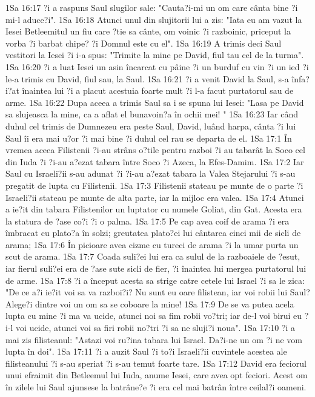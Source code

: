1Sa 16:17  ?i a raspuns Saul slugilor sale: "Cauta?i-mi un om care cânta bine ?i mi-l aduce?i".
1Sa 16:18  Atunci unul din slujitorii lui a zis: "Iata eu am vazut la Iesei Betleemitul un fiu care ?tie sa cânte, om voinic ?i razboinic, priceput la vorba ?i barbat chipe? ?i Domnul este cu el".
1Sa 16:19  A trimis deci Saul vestitori la Iesei ?i i-a spus: "Trimite la mine pe David, fiul tau cel de la turma".
1Sa 16:20  ?i a luat Iesei un asin încarcat cu pâine ?i un burduf cu vin ?i un ied ?i le-a trimis cu David, fiul sau, la Saul.
1Sa 16:21  ?i a venit David la Saul, s-a înfa?i?at înaintea lui ?i a placut acestuia foarte mult ?i l-a facut purtatorul sau de arme.
1Sa 16:22  Dupa aceea a trimis Saul sa i se spuna lui Iesei: "Lasa pe David sa slujeasca la mine, ca a aflat el bunavoin?a în ochii mei! "
1Sa 16:23  Iar când duhul cel trimis de Dumnezeu era peste Saul, David, luând harpa, cânta ?i lui Saul îi era mai u?or ?i mai bine ?i duhul cel rau se departa de el.
1Sa 17:1  În vremea aceea Filistenii ?i-au strâns o?tile pentru razboi ?i au tabarât la Soco cel din Iuda ?i ?i-au a?ezat tabara între Soco ?i Azeca, la Efes-Damim.
1Sa 17:2  Iar Saul cu Israeli?ii s-au adunat ?i ?i-au a?ezat tabara la Valea Stejarului ?i s-au pregatit de lupta cu Filistenii.
1Sa 17:3  Filistenii stateau pe munte de o parte ?i Israeli?ii stateau pe munte de alta parte, iar la mijloc era valea.
1Sa 17:4  Atunci a ie?it din tabara Filistenilor un luptator cu numele Goliat, din Gat. Acesta era la statura de ?ase co?i ?i o palma.
1Sa 17:5  Pe cap avea coif de arama ?i era îmbracat cu plato?a în solzi; greutatea plato?ei lui cântarea cinci mii de sicli de arama;
1Sa 17:6  În picioare avea cizme cu tureci de arama ?i la umar purta un scut de arama.
1Sa 17:7  Coada suli?ei lui era ca sulul de la razboaiele de ?esut, iar fierul suli?ei era de ?ase sute sicli de fier, ?i înaintea lui mergea purtatorul lui de arme.
1Sa 17:8  ?i a început acesta sa strige catre cetele lui Israel ?i sa le zica: "De ce a?i ie?it voi sa va razboi?i? Nu sunt eu oare filistean, iar voi robii lui Saul? Alege?i dintre voi un om sa se coboare la mine!
1Sa 17:9  De se va putea acela lupta cu mine ?i ma va ucide, atunci noi sa fim robii vo?tri; iar de-l voi birui eu ?i-l voi ucide, atunci voi sa firi robii no?tri ?i sa ne sluji?i noua".
1Sa 17:10  ?i a mai zis filisteanul: "Astazi voi ru?ina tabara lui Israel. Da?i-ne un om ?i ne vom lupta în doi".
1Sa 17:11  ?i a auzit Saul ?i to?i Israeli?ii cuvintele acestea ale filisteanului ?i s-au speriat ?i s-au temut foarte tare.
1Sa 17:12  David era feciorul unui efraimit din Betleemul lui Iuda, anume Iesei, care avea opt feciori. Acest om în zilele lui Saul ajunsese la batrâne?e ?i era cel mai batrân între ceilal?i oameni.
